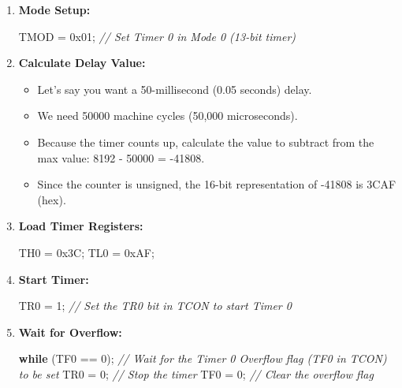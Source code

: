 \documentclass[
]{article}
\newenvironment{Shaded}{}{}
\newcommand{\BaseNTok}[1]{\textcolor[rgb]{0.25,0.63,0.44}{#1}}
\newcommand{\CommentTok}[1]{\textcolor[rgb]{0.38,0.63,0.69}{\textit{#1}}}
\newcommand{\ControlFlowTok}[1]{\textcolor[rgb]{0.00,0.44,0.13}{\textbf{#1}}}
\newcommand{\DecValTok}[1]{\textcolor[rgb]{0.25,0.63,0.44}{#1}}
\newcommand{\NormalTok}[1]{#1}
\newcommand{\OperatorTok}[1]{\textcolor[rgb]{0.40,0.40,0.40}{#1}}
\begin{document}
\begin{enumerate}
\def\labelenumi{\arabic{enumi}.}
\item
  \textbf{Mode Setup:}

\begin{Shaded}
\begin{Highlighting}[]
\NormalTok{TMOD }\OperatorTok{=} \BaseNTok{0x01}\OperatorTok{;}  \CommentTok{// Set Timer 0 in Mode 0 (13{-}bit timer)}
\end{Highlighting}
\end{Shaded}
\item
  \textbf{Calculate Delay Value:}

  \begin{itemize}
  \item
    Let's say you want a 50-millisecond (0.05 seconds) delay.
  \item
    We need 50000 machine cycles (50,000 microseconds).
  \item
    Because the timer counts up, calculate the value to subtract from
    the max value: 8192 - 50000 = -41808.
  \item
    Since the counter is unsigned, the 16-bit representation of -41808
    is 3CAF (hex).
  \end{itemize}
\item
  \textbf{Load Timer Registers:}

\begin{Shaded}
\begin{Highlighting}[]
\NormalTok{TH0 }\OperatorTok{=} \BaseNTok{0x3C}\OperatorTok{;}
\NormalTok{TL0 }\OperatorTok{=} \BaseNTok{0xAF}\OperatorTok{;}
\end{Highlighting}
\end{Shaded}
\item
  \textbf{Start Timer:}

\begin{Shaded}
\begin{Highlighting}[]
\NormalTok{TR0 }\OperatorTok{=} \DecValTok{1}\OperatorTok{;} \CommentTok{// Set the TR0 bit in TCON to start Timer 0}
\end{Highlighting}
\end{Shaded}
\item
  \textbf{Wait for Overflow:}

\begin{Shaded}
\begin{Highlighting}[]
\ControlFlowTok{while} \OperatorTok{(}\NormalTok{TF0 }\OperatorTok{==} \DecValTok{0}\OperatorTok{);} \CommentTok{// Wait for the Timer 0 Overflow flag (TF0 in TCON) to be set}
\NormalTok{TR0 }\OperatorTok{=} \DecValTok{0}\OperatorTok{;} \CommentTok{// Stop the timer}
\NormalTok{TF0 }\OperatorTok{=} \DecValTok{0}\OperatorTok{;} \CommentTok{// Clear the overflow flag}
\end{Highlighting}
\end{Shaded}
\end{enumerate}
\end{document}
